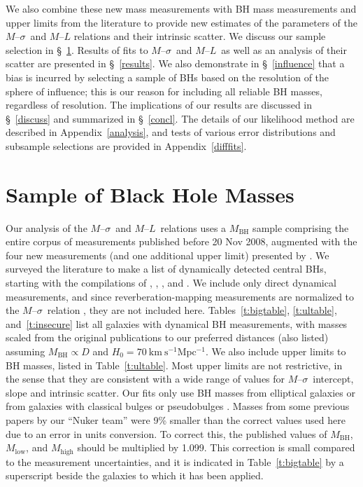 \documentclass[twosided,letterpaper,numberedappendix]{emulateapj}
\newcommand{\msigma}   {\ensuremath{M}{--}\ensuremath{\sigma}}
\newcommand{\ml}       {\ensuremath{M}{--}\ensuremath{L}}
\newcommand{\mbh}      {\ensuremath{M_{\mathrm{BH}}}}
\begin{document}
We also combine these new mass measurements with BH mass
measurements and upper limits from the literature to provide new
estimates of the parameters of the \msigma\ and $M$--$L$ relations and
their intrinsic scatter.  We discuss our sample selection in
\S~\ref{sample}.  Results of fits to \msigma\ and \ml\ as well as
an analysis of their scatter are presented in \S~\ref{results}.  We
also demonstrate in \S~\ref{influence} that a bias is incurred by 
selecting a sample of BHs based on the resolution of the sphere of 
influence; this is our reason for including all reliable
BH masses, regardless of resolution.  The implications of our
results are discussed in \S~\ref{discuss} and summarized in
\S~\ref{concl}.  The details of our likelihood method are described in
Appendix~\ref{analysis}, and tests of various error distributions and
subsample selections are provided in Appendix~\ref{difffits}.



\section{Sample of Black Hole Masses}
\label{sample}
  
Our analysis of the \msigma\ and \ml\ relations uses a
$M_{\mathrm{BH}}$ sample comprising the entire corpus of measurements
published before 20 Nov 2008, augmented with the four new measurements
(and one additional upper limit) presented by
\citet{Gultekin_etal_2008}.  We surveyed the literature to make a list
of dynamically detected central BHs, starting with the
compilations of \citet{tremaineetal02}, \citet{mh03}, \citet{ff05}, and 
\citet{graham08}.    We include only direct dynamical measurements,
and since reverberation-mapping measurements
\citep[e.g.,][]{petersonetal04} are normalized to the \msigma\
relation \citep{onkenetal04}, they are not included here.
%
Tables~\ref{t:bigtable}, \ref{t:ultable}, and~\ref{t:insecure} list
all galaxies with dynamical BH measurements, with masses scaled from
the original publications to our preferred distances (also listed)
assuming $\mbh \propto D$ and $H_0 = 70~\mathrm{km~s^{-1} Mpc^{-1}}$.
We also include upper limits to BH masses, listed in
Table~\ref{t:ultable}.  Most upper limits are not restrictive, in the
sense that they are consistent with a wide range of values for
\msigma\ intercept, slope and intrinsic scatter.  Our fits only use BH
masses from elliptical galaxies or from galaxies with classical bulges
or pseudobulges \citep{kk04}.  Masses from some previous papers by our
``Nuker team'' \citep{2000AJ....119.1157G,2003ApJ...583...92G} were
9\% smaller than the correct values used here due to an error in units
conversion.  To correct this, the published values of $\mbh$,
$M_\mathrm{low}$, and $M_\mathrm{high}$ should be multiplied by 1.099.
This correction is small compared to the measurement uncertainties,
and it is indicated in Table~\ref{t:bigtable} by a superscript beside
the galaxies to which it has been applied.
\end{document}
